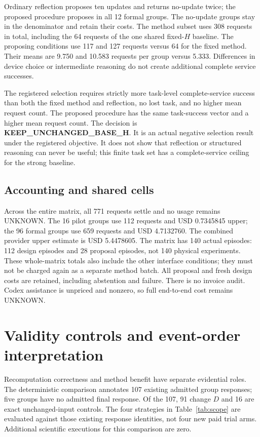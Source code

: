 Ordinary reflection proposes ten updates and returns no-update twice; the
proposed procedure proposes in all 12 formal groups. The no-update groups stay
in the denominator and retain their costs. The method subset uses 308 requests
in total, including the 64 requests of the one shared fixed-$H$ baseline. The
proposing conditions use 117 and 127 requests versus 64 for the fixed method.
Their means are 9.750 and 10.583 requests per group versus 5.333. Differences
in device choice or intermediate reasoning do not create additional complete
service successes.

The registered selection requires strictly more task-level complete-service
success than both the fixed method and reflection, no lost task, and no higher
mean request count. The proposed procedure has the same task-success vector
and a higher mean request count. The decision is
\textbf{KEEP\_UNCHANGED\_BASE\_H}. It is an actual negative selection result
under the registered objective. It does not show that reflection or structured
reasoning can never be useful; this finite task set has a complete-service
ceiling for the strong baseline.

\subsection{Accounting and shared cells}
Across the entire matrix, all 771 requests settle and no usage remains UNKNOWN.
The 16 pilot groups use 112 requests and USD 0.7345845 upper; the 96 formal
groups use 659 requests and USD 4.7132760. The combined provider upper estimate
is USD 5.4478605. The matrix has 140 actual episodes: 112 design episodes and
28 proposal episodes, not 140 physical experiments. These whole-matrix totals
also include the other interface conditions; they must not be charged again
as a separate method batch. All proposal and fresh design costs are retained,
including abstention and failure. There is no invoice audit. Codex assistance
is unpriced and nonzero, so full end-to-end cost remains UNKNOWN.

\section{Validity controls and event-order interpretation}
Recomputation correctness and method benefit have separate evidential roles.
The deterministic comparison annotates 107 existing admitted group responses;
five groups have no admitted final response. Of the 107, 91 change $D$ and
16 are exact unchanged-input controls. The four strategies in
Table~\ref{tab:scope} are evaluated against those existing response identities,
not four new paid trial arms. Additional scientific executions for this
comparison are zero.

